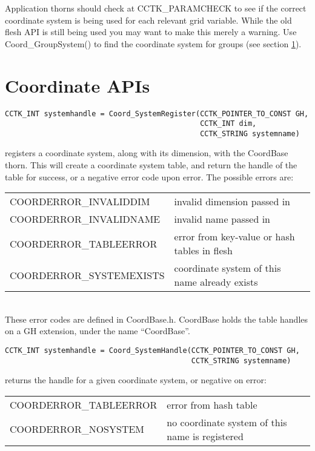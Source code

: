 Application thorns should check at CCTK\_PARAMCHECK to see if the correct
coordinate system is being used for each relevant grid variable.
While the old flesh API is still being used you may want to make this
merely a warning.
Use Coord\_GroupSystem() to find the coordinate system for groups (see
section \ref{CactusBase_CoordBase_APIs}).


\section{Coordinate APIs}
\label{CactusBase_CoordBase_APIs}

\begin{verbatim}
CCTK_INT systemhandle = Coord_SystemRegister(CCTK_POINTER_TO_CONST GH,
                                             CCTK_INT dim, 
                                             CCTK_STRING systemname)
\end{verbatim}
registers a coordinate system, along with its
dimension, with the CoordBase thorn.  This will create a coordinate
system table, and return the handle of the table for success, or a
negative error code upon error.  The possible errors are:\beforetable
\begin{tabular}{ll}
COORDERROR\_INVALIDDIM   & invalid dimension passed in\\
COORDERROR\_INVALIDNAME  & invalid name passed in\\
COORDERROR\_TABLEERROR   & error from key-value or hash tables in flesh\\
COORDERROR\_SYSTEMEXISTS & coordinate system of this name already exists\\
\end{tabular}
\\These error codes are defined in CoordBase.h.  CoordBase holds the
table handles on a GH extension, under the name ``CoordBase''.

\begin{verbatim}
CCTK_INT systemhandle = Coord_SystemHandle(CCTK_POINTER_TO_CONST GH,
                                           CCTK_STRING systemname)
\end{verbatim}
returns the handle for a given coordinate system, or 
negative on error:\beforetable
\begin{tabular}{ll}
   COORDERROR\_TABLEERROR &  error from hash table\\
   COORDERROR\_NOSYSTEM   &  no coordinate system of this name is registered\\
\end{tabular}


